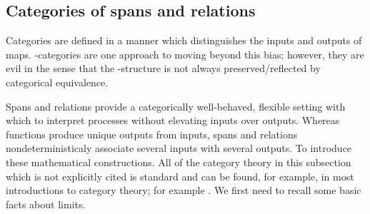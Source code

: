 
\subsection{Categories of spans and relations}
\label{subsec:spanrel}
Categories are defined in a manner which distinguishes the inputs and outputs of maps.  \dag-categories are one approach to moving beyond this bias; however, they are evil in the sense that the \dag-structure is not always preserved/reflected by categorical equivalence.

Spans and relations provide a categorically well-behaved, flexible setting with which to interpret processes without elevating inputs over outputs.
Whereas functions produce unique outputs from inputs, spans and relations nondeterministicaly associate several inputs with several outputs.  To introduce these mathematical constructions.
All of the category theory in this subsection which is not explicitly cited is standard and can be found, for example, in most introductions to category theory; for example \cite{maclane}.
We first need to recall some basic facts about limits.
